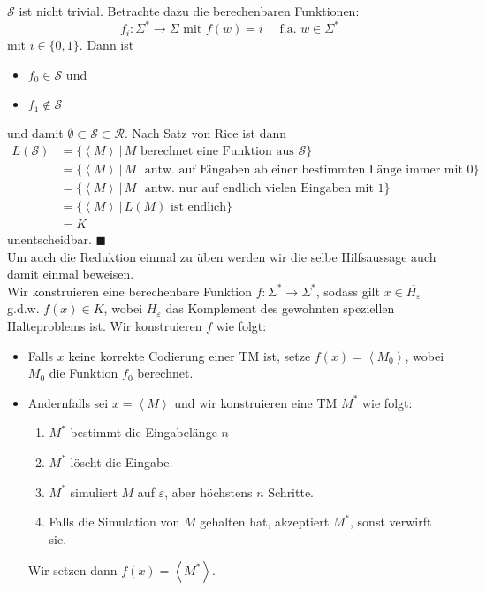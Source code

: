 \documentclass[11pt,a4paper]{article}
\newcommand{\qedb}{\hfill\(\blacksquare\)}
\begin{document}
\( \mathcal{S} \) ist nicht trivial. Betrachte dazu die berechenbaren Funktionen:
\[
	f_i: \Sigma^\ast \to \Sigma \text{ mit } f(w) = i \quad\text{ f.a. } w \in \Sigma^\ast
\]
mit \( i \in \{ 0, 1 \} \). Dann ist
\begin{itemize}
	\item \( f_0 \in \mathcal{S} \) und
	\item \( f_1 \notin \mathcal{S} \)
\end{itemize}
und damit \( \emptyset \subset \mathcal{S} \subset \mathcal{R} \). Nach Satz von Rice ist dann
\begin{align*}
	L(\mathcal{S}) &= \{ \left\langle M \right\rangle \,\vert\, M \text{ berechnet eine Funktion aus } \mathcal{S} \}\\
		&= \{ \left\langle M \right\rangle \,\vert\, M \text{ {antw.} auf Eingaben ab einer bestimmten L\"ange immer mit } 0 \}\\
		&= \{ \left\langle M \right\rangle \,\vert\, M \text{ {antw.} nur auf endlich vielen Eingaben mit } 1 \}\\
		&= \{ \left\langle M \right\rangle \,\vert\, L(M) \text{ ist endlich} \}\\
		&= K
\end{align*}
unentscheidbar. \qedb\\[2em]
Um auch die Reduktion einmal zu \"uben werden wir die selbe Hilfsaussage auch damit einmal beweisen.\\
Wir konstruieren eine berechenbare Funktion \( f: \Sigma^\ast \to \Sigma^\ast \), sodass gilt \( x \in \overline{H_\varepsilon} \) {g.d.w.} \( f(x) \in K \), wobei \( \overline{H_\varepsilon} \) das Komplement des gewohnten speziellen Halteproblems ist. Wir konstruieren \( f \) wie folgt:
\begin{itemize}
	\item Falls \( x \) keine korrekte Codierung einer TM ist, setze \( f(x) = \left\langle M_0 \right\rangle \), wobei \( M_0 \) die Funktion \( f_0 \) berechnet.
	\item Andernfalls sei \( x = \left\langle M \right\rangle \) und wir konstruieren eine TM \( M^\ast \) wie folgt:
		\begin{enumerate}
			\item \( M^\ast \) bestimmt die Eingabel\"ange \( n \)
			\item \( M^\ast \) l\"oscht die Eingabe.
			\item \( M^\ast \) simuliert \( M \) auf \( \varepsilon \), aber h\"ochstens \( n \) Schritte.
			\item Falls die Simulation von \( M \) gehalten hat, akzeptiert \( M^\ast \), sonst verwirft sie.
		\end{enumerate}
		Wir setzen dann \( f(x) = \left\langle M^\ast \right\rangle \).
\end{itemize}
\end{document}
